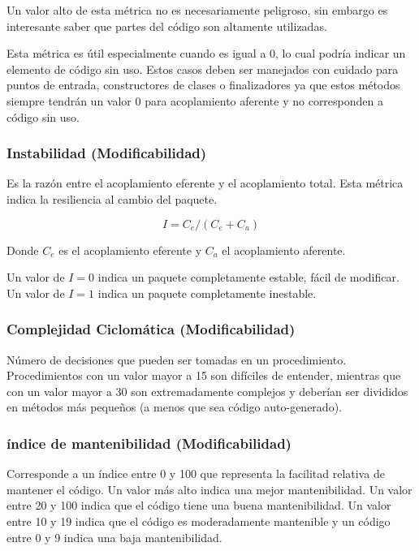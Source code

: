 Un valor alto de esta métrica no es necesariamente peligroso, sin embargo es interesante saber que partes 
del código son altamente utilizadas.

Esta métrica es útil especialmente cuando es igual a $0$, lo cual podría indicar un elemento de código sin 
uso. Estos casos deben ser manejados con cuidado para puntos de entrada, constructores de clases o 
finalizadores ya que estos métodos siempre tendrán un valor $0$ para acoplamiento aferente y no 
corresponden a código sin uso.

\subsubsection{Instabilidad (Modificabilidad)}

Es la razón entre el acoplamiento eferente y el acoplamiento total. Esta métrica indica la resiliencia 
al cambio del paquete.

\begin{equation*}
I = C_e / (C_e + C_a)
\end{equation*}

Donde $C_e$ es el acoplamiento eferente y $C_a$ el acoplamiento aferente.

Un valor de $I=0$ indica un paquete completamente estable, fácil de modificar. Un valor de $I=1$ indica 
un paquete completamente inestable.

\subsubsection{Complejidad Ciclomática (Modificabilidad)}
Número de decisiones que pueden ser tomadas en un procedimiento.
Procedimientos con un valor mayor a 15 son difíciles de entender, mientras que con un valor mayor a 30 
son extremadamente complejos y deberían ser divididos en métodos más pequeños (a menos que sea código 
auto-generado).

\subsubsection{índice de mantenibilidad (Modificabilidad)}

Corresponde a un índice entre 0 y 100 que representa la facilitad relativa
de mantener el código. Un valor más alto indica una mejor mantenibilidad. Un valor entre 20 y 100 
indica que el código tiene una buena mantenibilidad. Un valor entre 10 y 19 indica que el código es 
moderadamente mantenible y un código entre 0 y 9 indica una baja mantenibilidad.

